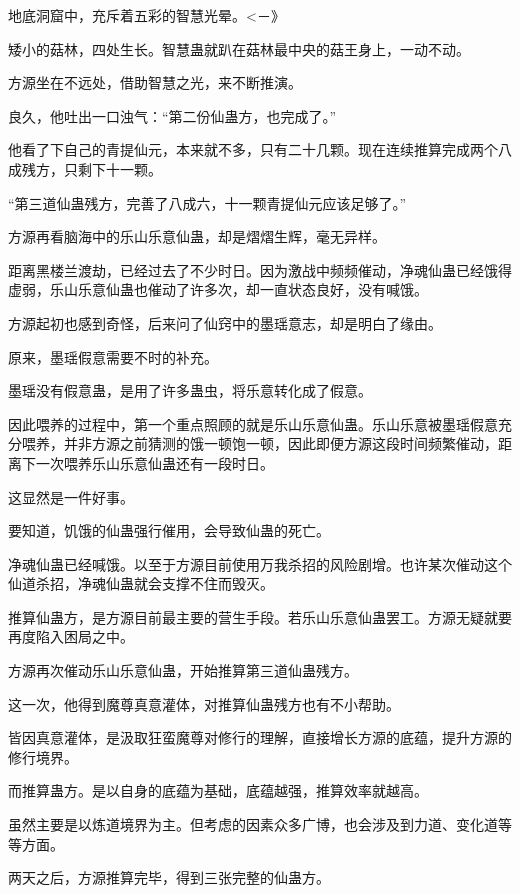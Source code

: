 
\begin{this_body}

地底洞窟中，充斥着五彩的智慧光晕。<－》

矮小的菇林，四处生长。智慧蛊就趴在菇林最中央的菇王身上，一动不动。

方源坐在不远处，借助智慧之光，来不断推演。

良久，他吐出一口浊气：“第二份仙蛊方，也完成了。”

他看了下自己的青提仙元，本来就不多，只有二十几颗。现在连续推算完成两个八成残方，只剩下十一颗。

“第三道仙蛊残方，完善了八成六，十一颗青提仙元应该足够了。”

方源再看脑海中的乐山乐意仙蛊，却是熠熠生辉，毫无异样。

距离黑楼兰渡劫，已经过去了不少时日。因为激战中频频催动，净魂仙蛊已经饿得虚弱，乐山乐意仙蛊也催动了许多次，却一直状态良好，没有喊饿。

方源起初也感到奇怪，后来问了仙窍中的墨瑶意志，却是明白了缘由。

原来，墨瑶假意需要不时的补充。

墨瑶没有假意蛊，是用了许多蛊虫，将乐意转化成了假意。

因此喂养的过程中，第一个重点照顾的就是乐山乐意仙蛊。乐山乐意被墨瑶假意充分喂养，并非方源之前猜测的饿一顿饱一顿，因此即便方源这段时间频繁催动，距离下一次喂养乐山乐意仙蛊还有一段时日。

这显然是一件好事。

要知道，饥饿的仙蛊强行催用，会导致仙蛊的死亡。

净魂仙蛊已经喊饿。以至于方源目前使用万我杀招的风险剧增。也许某次催动这个仙道杀招，净魂仙蛊就会支撑不住而毁灭。

推算仙蛊方，是方源目前最主要的营生手段。若乐山乐意仙蛊罢工。方源无疑就要再度陷入困局之中。

方源再次催动乐山乐意仙蛊，开始推算第三道仙蛊残方。

这一次，他得到魔尊真意灌体，对推算仙蛊残方也有不小帮助。

皆因真意灌体，是汲取狂蛮魔尊对修行的理解，直接增长方源的底蕴，提升方源的修行境界。

而推算蛊方。是以自身的底蕴为基础，底蕴越强，推算效率就越高。

虽然主要是以炼道境界为主。但考虑的因素众多广博，也会涉及到力道、变化道等等方面。

两天之后，方源推算完毕，得到三张完整的仙蛊方。


\end{this_body}
